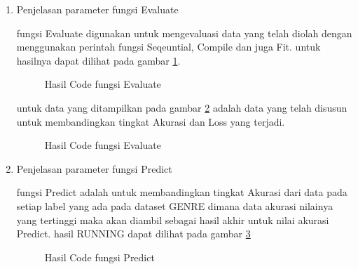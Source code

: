 \begin{enumerate}
\item Penjelasan parameter fungsi Evaluate



\subitem fungsi Evaluate digunakan untuk mengevaluasi data yang telah diolah dengan menggunakan perintah fungsi Seqeuntial, Compile dan juga Fit. untuk hasilnya dapat dilihat pada gambar \ref{data19}.

\begin{figure}[!htbp]
      \caption{Hasil Code fungsi Evaluate}
      \label{data19}
\end{figure}




\subitem untuk data yang ditampilkan pada gambar \ref{data20} adalah data yang telah disusun untuk membandingkan tingkat Akurasi dan Loss yang terjadi.

\begin{figure}[!htbp]
      \caption{Hasil Code fungsi Evaluate}
      \label{data20}
\end{figure}

\item Penjelasan parameter fungsi Predict



\subitem fungsi Predict adalah untuk membandingkan tingkat Akurasi dari data pada setiap label yang ada pada dataset GENRE dimana data akurasi nilainya yang tertinggi maka akan diambil sebagai hasil akhir untuk nilai akurasi Predict. hasil RUNNING dapat dilihat pada gambar \ref{data21}

\begin{figure}[!htbp]
      \caption{Hasil Code fungsi Predict}
      \label{data21}
\end{figure}
\end{enumerate}